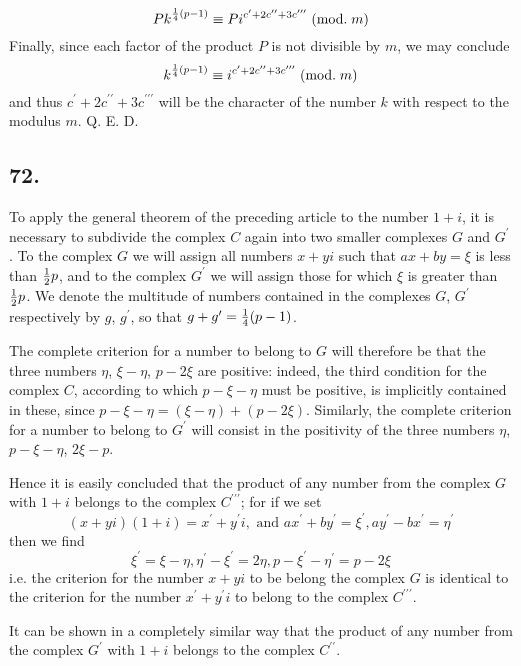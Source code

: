 \documentclass[twoside,12pt]{memoir}
\renewcommand{\pmod}[1]{\;(\textrm{mod.}\;#1)}
\let\oldfrac\frac
\def\frac#1#2{\mathchoice{\tfrac{#1}{#2}}{\oldfrac{#1}{#2}}{\genfrac{}{}{}{2}{#1}{#2\mathstrut}}{\genfrac{}{}{}{3}{#1}{#2\mathstrut}}}
\begin{document}
\[P k^{\frac{1}{4}(p-1)} \equiv P i^{c^{\prime}+2 c^{\prime \prime}+3 c^{\prime \prime \prime}}\pmod{m}\]
Finally, since each factor of the product \(P\) is not divisible by \(m\), we may conclude
\[k^{\frac{1}{4}(p-1)} \equiv i^{c^{\prime}+2 c^{\prime \prime}+3 c^{\prime \prime \prime}}\pmod{m}\]
and thus \(c^{\prime}+2 c^{\prime \prime}+3 c^{\prime \prime \prime}\) will be the character of the number \(k\) with respect to the modulus \(m\). Q. E. D.\pagebreak%

\subsection*{72.}

To apply the general theorem of the preceding article to the number \(1+i\), it is necessary to subdivide the complex \(C\) again into two smaller complexes \(G\) and \(G^{\prime}\). To the complex \(G\) we will assign all numbers \(x+yi\) such that \(ax+by = \xi\) is less than \(\frac{1}{2}p\), and to the complex \(G^{\prime}\) we will assign those for which \(\xi\) is greater than \(\frac{1}{2}p\).  We denote the multitude of numbers contained in the complexes \(G\), \(G^{\prime}\) respectively by \(g\), \(g^{\prime}\), so that \(g+g^{\prime} = \frac{1}{4}(p-1)\).

The complete criterion for a number to belong to \(G\) will therefore be that the three numbers \(\eta\), \(\xi-\eta\), \(p-2\xi\) are positive: indeed, the third condition for the complex \(C\), according to which \(p-\xi-\eta\) must be positive, is implicitly contained in these, since \(p-\xi-\eta = (\xi-\eta) + (p-2\xi)\). Similarly, the complete criterion for a number to belong to \(G^{\prime}\) will consist in the positivity of the three numbers \(\eta\), \(p-\xi-\eta\), \(2\xi-p\).

Hence it is easily concluded that the product of any number from the complex \(G\) with \(1+i\) belongs to the complex \(C^{\prime\prime\prime}\); for if we set
\[(x+yi)(1+i) = x^{\prime}+y^{\prime}i, \text{ and } ax^{\prime}+by^{\prime}=\xi^{\prime}, ay^{\prime}-bx^{\prime}=\eta^{\prime}\]
then we find
\[\xi^{\prime} = \xi-\eta, \eta^{\prime}-\xi^{\prime}=2\eta, p-\xi^{\prime}-\eta^{\prime}=p-2\xi\]
i{.}e{.} the criterion for the number \(x+yi\) to be belong the complex \(G\) is identical to the criterion for the number \(x^{\prime}+y^{\prime}i\) to belong to the complex \(C^{\prime\prime\prime}\).

It can be shown in a completely similar way that the product of any number from the complex \(G^{\prime}\) with \(1+i\) belongs to the complex \(C^{\prime\prime}\).
\end{document}
